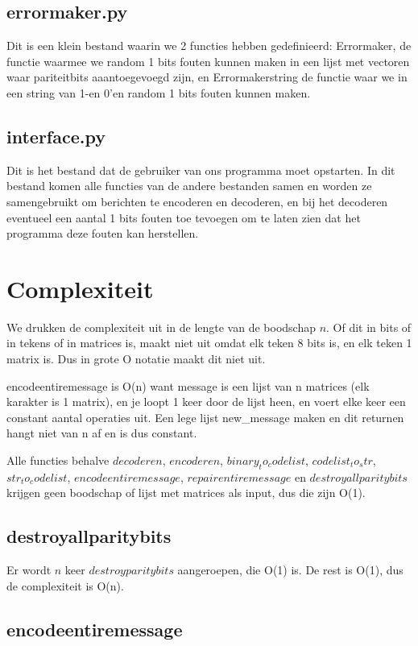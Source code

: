 \documentclass[a4paper]{article}
\begin{document}
\subsection{errormaker.py}
	Dit is een klein bestand waarin we 2 functies hebben gedefinieerd: Errormaker, de functie waarmee we random 1 bits fouten kunnen maken in een lijst met vectoren waar pariteitbits aaantoegevoegd zijn, en Errormakerstring de functie waar we in een string van 1-en 0'en random 1 bits fouten kunnen maken.

\subsection{interface.py}
	Dit is het bestand dat de gebruiker van ons programma moet opstarten. In dit bestand komen alle functies van de andere bestanden samen en worden ze samengebruikt om berichten te encoderen en decoderen, en bij het decoderen eventueel een aantal 1 bits fouten toe tevoegen om te laten zien dat het programma deze fouten kan herstellen.

\section{Complexiteit}
We drukken de complexiteit uit in de lengte van de boodschap \(n\). Of dit in bits of in tekens of in matrices is, maakt niet uit omdat elk teken 8 bits is, en elk teken 1 matrix is. Dus in grote O notatie maakt dit niet uit.

encodeentiremessage is O(n) want message is een lijst van n matrices (elk karakter is 1 matrix), en je loopt 1 keer door de lijst heen, en voert elke keer een constant aantal operaties uit. Een lege lijst new\_message maken en dit returnen hangt niet van n af en is dus constant.

Alle functies behalve $decoderen$, $encoderen$, $binary_to_codelist$, $codelist_to_str$, $str_to_codelist$, $encodeentiremessage$, $repairentiremessage$ en $destroyallparitybits$ krijgen geen boodschap of lijst met matrices als input, dus die zijn O(1). 

\subsection{destroyallparitybits}

Er wordt $n$ keer $destroyparitybits$ aangeroepen, die O(1) is. De rest is O(1), dus de complexiteit is O(n).

\subsection{encodeentiremessage}
\end{document}
